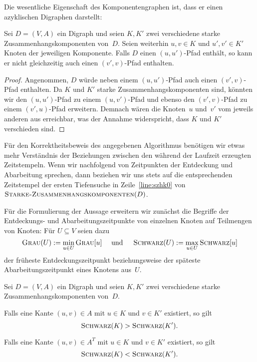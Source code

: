 \begin{bem}
Die wesentliche Eigenschaft des Komponentengraphen ist, dass er einen azyklischen Digraphen darstellt:
\end{bem} 

\begin{lem}
\label{lem:komponentengraph-azyklisch}
Sei $D=(V,A)$ ein Digraph und seien $K,K'$ zwei verschiedene starke Zusammenhangskomponenten von~$D$.
Seien weiterhin $u,v \in K$ und $u',v' \in K'$ Knoten der jeweiligen Komponente.
Falls $D$ einen $(u,u')$-Pfad enthält, so kann er nicht gleichzeitig auch einen $(v',v)$-Pfad enthalten.
\end{lem}

\begin{proof}
Angenommen, $D$ würde neben einem $(u,u')$-Pfad auch einen $(v',v)$-Pfad enthalten.
Da $K$ und $K'$ starke Zusammenhangskomponenten sind, könnten wir den $(u,u')$-Pfad zu einem $(u,v')$-Pfad und ebenso den $(v',v)$-Pfad zu einem $(v',u)$-Pfad erweitern.
Demnach wären die Knoten~$u$ und~$v'$ vom jeweils anderen aus erreichbar, was der Annahme widerspricht, dass $K$ und $K'$ verschieden sind.
\end{proof}

\begin{bem}
Für den Korrektheitsbeweis des angegebenen Algorithmus benötigen wir etwas mehr Verständnis der Beziehungen zwischen den während der Laufzeit erzeugten Zeitstempeln.
Wenn wir nachfolgend von Zeitpunkten der Entdeckung und Abarbeitung sprechen, dann beziehen wir uns stets auf die entsprechenden Zeitstempel der ersten Tiefensuche in Zeile~\ref{line:szhk0} von $\mathop{\text{\textsc{Starke-Zusammenhangskomponenten}}}(D)$.

Für die Formulierung der Aussage erweitern wir zunächst die Begriffe der Entde\-ckungs- und Abarbeitungszeitpunkte von einzelnen Knoten auf Teilmengen von Knoten:
Für $U \subseteq V$ seien dazu
\[
\mathop{\text{\textsc{Grau}}}(U) := \min_{u \in U} \mathop{\text{\textsc{Grau}}}[u] \quad \text{ und } \quad\mathop{\text{\textsc{Schwarz}}}(U) := \max_{u \in U} \mathop{\text{\textsc{Schwarz}}}[u]
\]
der früheste Entdeckungszeitpunkt beziehungsweise der späteste Abarbeitungszeitpunkt eines Knotens aus~$U$.
\end{bem}

\begin{lem}
\label{lem:komponenten-zeitpunkte}
Sei $D=(V,A)$ ein Digraph und seien $K,K'$ zwei verschiedene starke Zusammenhangskomponenten von~$D$.
\begin{enumi}
 \item\label{lem:komponenten-zeitpunkte:primal} Falls eine Kante $(u,v) \in A$ mit $u \in K$ und $v \in K'$ existiert, so gilt
 \[
 \mathop{\text{\textsc{Schwarz}}}(K) > \mathop{\text{\textsc{Schwarz}}}(K').
 \]
 
 \item\label{lem:komponenten-zeitpunkte:transponiert} Falls eine Kante $(u,v) \in A^T$ mit $u \in K$ und $v \in K'$ existiert, so gilt
 \[
 \mathop{\text{\textsc{Schwarz}}}(K) < \mathop{\text{\textsc{Schwarz}}}(K').
 \]
\end{enumi}
\end{lem}

